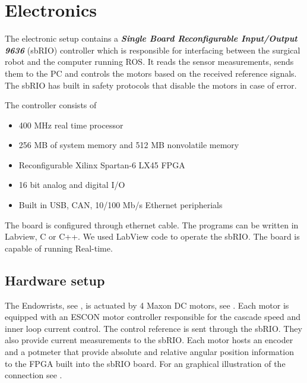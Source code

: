 \section{Electronics}\label{sec:electronics}

The electronic setup contains a \textbf{\textit{Single Board Reconfigurable Input/Output 9636}} (sbRIO) controller which is responsible for interfacing between the surgical robot and the computer running ROS. It reads the sensor measurements, sends them to the PC and controls the motors based on the received reference signals. The sbRIO has built in safety protocols that disable the motors in case of error.

The controller consists of
\begin{itemize}
	\item 400 MHz real time processor
	\item 256 MB of system memory and 512 MB nonvolatile memory
	\item Reconfigurable Xilinx Spartan-6 LX45 FPGA
	\item 16 bit analog and digital I/O
	\item Built in USB, CAN, 10/100 Mb/s Ethernet peripherials
\end{itemize}

The board is configured through ethernet cable. The programs can be written in Labview, C or C++. We used LabView code to operate the sbRIO. The board is capable of running Real-time. %


\subsection{Hardware setup}

The Endowrists, see , is actuated by 4 Maxon DC motors, see . Each motor is equipped with an ESCON motor controller responsible for the cascade speed and inner loop current control. The control reference is sent through the sbRIO. They also provide current measurements to the sbRIO. Each motor hosts an encoder and a potmeter that provide absolute and relative angular position information to the FPGA built into the sbRIO board. For an graphical illustration of the connection see .
 
